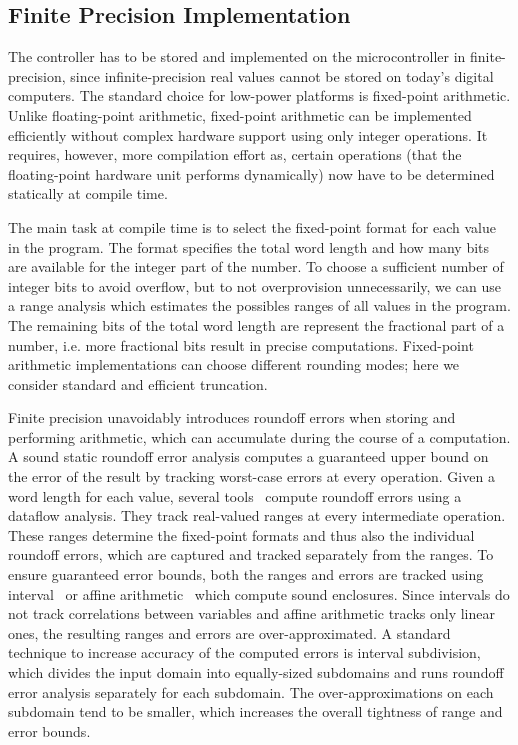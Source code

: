 \subsection{Finite Precision Implementation}

The controller has to be stored and implemented on the microcontroller in
finite-precision, since infinite-precision real values cannot be stored on
today's digital computers.
The standard choice for low-power platforms is fixed-point arithmetic. Unlike
floating-point arithmetic, fixed-point arithmetic can be implemented efficiently
without complex hardware support using only integer operations. It requires,
however, more compilation effort as, certain operations (that the floating-point
hardware unit performs dynamically) now have to be determined statically at
compile time.
 
The main task at compile time is to select the fixed-point format for each value
in the program. The format specifies the total word length and how many bits are
available for the integer part of the number. To choose a sufficient number of
integer bits to avoid overflow, but to not overprovision unnecessarily, we can
use a range analysis which estimates the possibles ranges of all values
in the program. The remaining bits of the total word length are represent the
fractional part of a number, i.e. more fractional bits result in precise
computations.
Fixed-point arithmetic implementations can choose different rounding modes; here
we consider standard and efficient truncation.

Finite precision unavoidably introduces roundoff errors when storing and
performing arithmetic, which can accumulate during the course of a computation.
A sound static roundoff error analysis computes a guaranteed upper bound on the
error of the result by tracking worst-case errors at every operation. Given a
word length for each value, several tools~\cite{} compute roundoff errors using
a dataflow analysis.
They track real-valued ranges at every intermediate operation. These ranges
determine the fixed-point formats and thus also the individual roundoff errors,
which are captured and tracked separately from the ranges. To ensure guaranteed
error bounds, both the ranges and errors are tracked using interval~\cite{} or
affine arithmetic~\cite{} which compute sound enclosures. Since intervals do not
track correlations between variables and affine arithmetic tracks only linear
ones, the resulting ranges and errors are over-approximated.
A standard technique to increase accuracy of the computed errors is interval
subdivision, which divides the input domain into equally-sized subdomains and
runs roundoff error analysis separately for each subdomain. The
over-approximations on each subdomain tend to be smaller, which increases the
overall tightness of range and error bounds.

